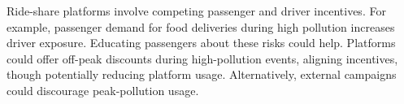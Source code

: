 

Ride-share platforms involve competing passenger and driver incentives.
For example, passenger demand for food deliveries during high pollution increases driver exposure.
Educating passengers about these risks could help.
Platforms could offer off-peak discounts during high-pollution events, aligning incentives, though potentially reducing platform usage.
Alternatively, external campaigns could discourage peak-pollution usage.

